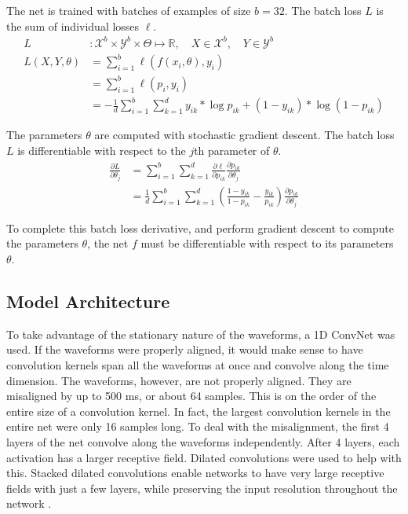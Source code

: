 The net is trained with batches of examples of size $b = 32$.  The batch loss $L$ is the sum of individual losses $\ell$.
\begin{align}
    L &: \mathcal{X}^b \times \mathcal{Y}^b 
        \times \Theta \mapsto \mathbb{R}, \quad
        X \in \mathcal{X}^b, \quad 
        Y \in \mathcal{Y}^b \\
    L(X, Y, \theta) 
        &= \sum_{i=1}^b \ell(f(x_i, \theta), y_i) \\
        &= \sum_{i=1}^b \ell(p_i, y_i) \\
        &= -\frac{1}{d} \sum_{i=1}^b \sum_{k=1}^d 
            y_{ik} * \log p_{ik} + (1 - y_{ik}) * \log(1 - p_{ik})
\end{align}

The parameters $\theta$ are computed with stochastic gradient descent.  The batch loss $L$ is differentiable with respect to the $j$th parameter of $\theta$.
\begin{align}
    \frac{\partial L}{\partial \theta_j} 
        &= \sum_{i=1}^b \sum_{k=1}^d 
            \frac{\partial \ell}{\partial p_{ik}}  
            \frac{\partial p_{ik}}{\partial \theta_j} \\
        &= \frac{1}{d} \sum_{i=1}^b \sum_{k=1}^d
            \left(
                \frac{1 - y_{ik}}{1 - p_{ik}} - \frac{y_{ik}}{p_{ik}}
            \right)
            \frac{\partial p_{ik}}{\partial \theta_j}
\end{align}



To complete this batch loss derivative, and perform gradient descent to compute the parameters $\theta$, the net $f$ must be differentiable with respect to its parameters $\theta$.

\subsection{Model Architecture}

To take advantage of the stationary nature of the waveforms, a 1D ConvNet was used.  If the waveforms were properly aligned, it would make sense to have convolution kernels span all the waveforms at once and convolve along the time dimension.  The waveforms, however, are not properly aligned.  They are misaligned by up to 500 ms, or about 64 samples.  This is on the order of the entire size of a convolution kernel.  In fact, the largest convolution kernels in the entire net were only 16 samples long.  To deal with the misalignment, the first 4 layers of the net convolve along the waveforms independently.  After 4 layers, each activation has a larger receptive field.  Dilated convolutions were used to help with this.  Stacked dilated convolutions enable networks to have very large receptive fields with just a few layers, while preserving the input resolution throughout the network \cite{oord2016wavenet}.  

